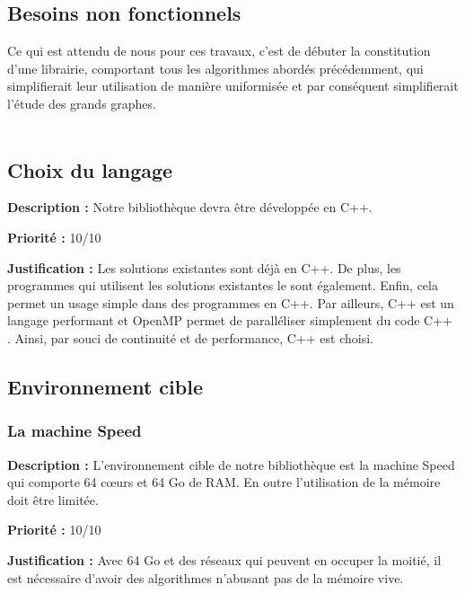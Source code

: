 \begin{titlepage}

\newpage
\begin{center}
\begin{bf}
\section{Besoins non fonctionnels}
\end{bf}
\end{center}

\vspace{1cm}
{
Ce qui est attendu de nous pour ces travaux, c'est de débuter la constitution d'une librairie, comportant tous les algorithmes abordés précédemment, qui simplifierait leur utilisation de manière uniformisée et par conséquent simplifierait l'étude des grands graphes.
\\ \\ 
}

\subsection{Choix du langage}
{
\textbf{Description :} Notre bibliothèque devra être développée en C++.

\textbf{Priorité :} 10/10

\textbf{Justification :} Les solutions existantes sont déjà en C++. De plus, les programmes qui utilisent les solutions existantes le sont également. Enfin, cela permet un usage simple dans des programmes en C++. Par ailleurs, C++ est un langage performant et OpenMP permet de paralléliser simplement du code C++ . Ainsi, par souci de continuité et de performance, C++ est choisi.
}

\subsection{Environnement cible}
\subsubsection{La machine Speed}
{
\textbf{Description :} L'environnement cible de notre bibliothèque est la machine Speed qui comporte 64 cœurs et 64 Go de RAM. En outre l'utilisation de la mémoire doit être limitée.

\textbf{Priorité :} 10/10

\textbf{Justification :} Avec 64 Go et des réseaux qui peuvent en occuper la moitié, il est nécessaire d'avoir des algorithmes n'abusant pas de la mémoire vive.
}


\end{titlepage}
